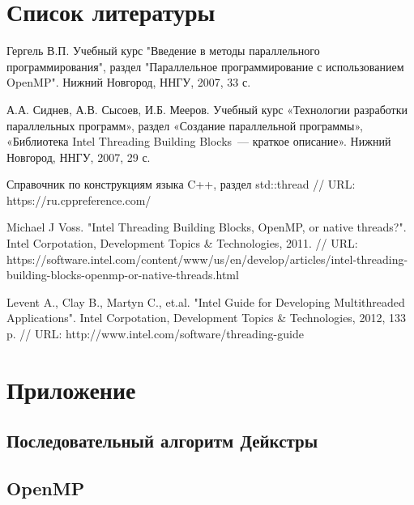 \documentclass{article}
\begin{document}
\section{Список литературы}
\begin{enumerate}
 Гергель В.П. Учебный курс "Введение в методы параллельного программирования", раздел "Параллельное программирование с использованием OpenMP". Нижний Новгород, ННГУ, 2007, 33 с.

 А.А. Сиднев, А.В. Сысоев, И.Б. Мееров. Учебный курс «Технологии разработки параллельных программ», раздел «Создание параллельной программы», «Библиотека Intel Threading Building Blocks~--- краткое описание». Нижний Новгород, ННГУ, 2007, 29 с. 

 Справочник по конструкциям языка C++, раздел std::thread // URL: https://ru.cppreference.com/

 Michael J Voss. "Intel Threading Building Blocks, OpenMP, or native threads?". Intel Corpotation, Development Topics \& Technologies, 2011. // URL: \linebreak https://software.intel.com/content/www/us/en/develop/articles/intel-threading-building-blocks-openmp-or-native-threads.html

 Levent A., Clay B., Martyn C., et.al. "Intel Guide for Developing Multithreaded Applications". Intel Corpotation, Development Topics \& Technologies, 2012, 133 p. // URL: http://www.intel.com/software/threading-guide
\end{enumerate}

\newpage

\section{Приложение}
\subsection{Последовательный алгоритм Дейкстры}




\subsection{OpenMP}



\end{document}
